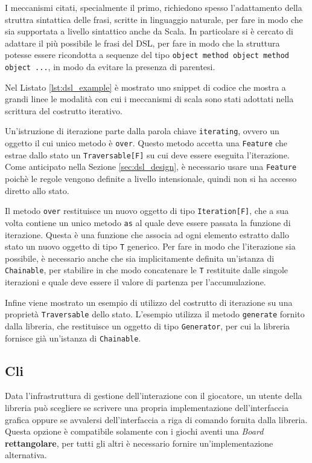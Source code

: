 I meccanismi citati, specialmente il primo, richiedono spesso l'adattamento della struttra sintattica delle frasi, scritte in linguaggio naturale, per fare in modo che sia supportata a livello sintattico anche da Scala.
%
In particolare si è cercato di adattare il più possibile le frasi del DSL, per fare in modo che la struttura potesse essere ricondotta a sequenze del tipo \texttt{object method object method object ...}, in modo da evitare la presenza di parentesi.

Nel Listato \ref{lst:dsl_example} è mostrato uno snippet di codice che mostra a grandi linee le modalità con cui i meccanismi di scala sono stati adottati nella scrittura del costrutto iterativo.
%

%
Un'istruzione di iterazione parte dalla parola chiave \texttt{iterating}, ovvero un oggetto il cui unico metodo è \texttt{over}.
%
Questo metodo accetta una \texttt{Feature} che estrae dallo stato un \texttt{Traversable[F]} su cui deve essere eseguita l'iterazione.
%
Come anticipato nella Sezione \ref{sec:dsl_design}, è necessario usare una \texttt{Feature} poichè le regole vengono definite a livello intensionale, quindi non si ha accesso diretto allo stato.

Il metodo \texttt{over} restituisce un nuovo oggetto di tipo \texttt{Iteration[F]}, che a sua volta contiene un unico metodo \texttt{as} al quale deve essere passata la funzione di iterazione.
%
Questa è una funzione che associa ad ogni elemento estratto dallo stato un nuovo oggetto di tipo \texttt{T} generico.
%
Per fare in modo che l'iterazione sia possibile, è necessario anche che sia implicitamente definita un'istanza di \texttt{Chainable}, per stabilire in che modo concatenare le \texttt{T} restituite dalle singole iterazioni e quale deve essere il valore di partenza per l'accumulazione.

Infine viene mostrato un esempio di utilizzo del costrutto di iterazione su una proprietà \texttt{Traversable} dello stato.
%
L'esempio utilizza il metodo \texttt{generate} fornito dalla libreria, che restituisce un oggetto di tipo \texttt{Generator}, per cui la libreria fornisce già un'istanza di \texttt{Chainable}.


\subsection{Cli}
%
Data l'infrastruttura di gestione dell'interazione con il giocatore, un utente della libreria può scegliere se scrivere una propria implementazione dell'interfaccia grafica oppure se avvalersi dell'interfaccia a riga di comando fornita dalla libreria.
%
Questa opzione è compatibile solamente con i giochi aventi una \textit{Board} \textbf{rettangolare}, per tutti gli altri è necessario fornire un'implementazione alternativa.

